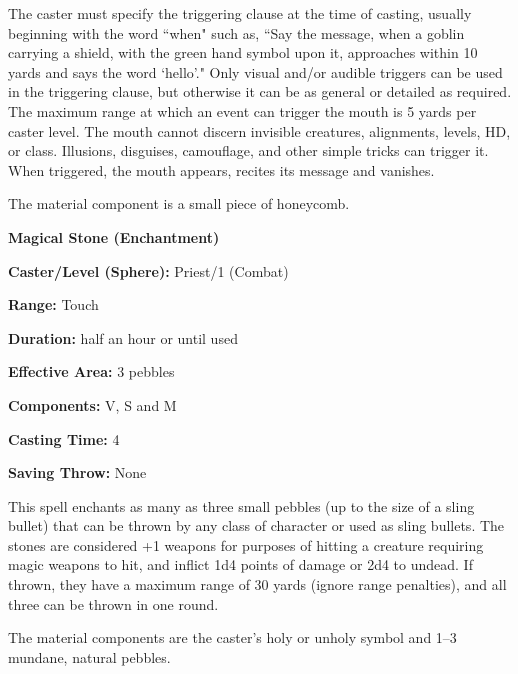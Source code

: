 \begin{multicols}{2}
The caster must specify the triggering clause at the time of casting, usually beginning with the word ``when" such as, ``Say the message, when a goblin carrying a shield, with the green hand symbol upon it, approaches within 10 yards and says the word `hello'."  Only visual and/or audible triggers can be used in the triggering clause, but otherwise it can be as general or detailed as required.  The maximum range at which an event can trigger the mouth is 5 yards per caster level.  The mouth cannot discern invisible creatures, alignments, levels, HD, or class.  Illusions, disguises, camouflage, and other simple tricks can trigger it.  When triggered, the mouth appears, recites its message and vanishes.

The material component is a small piece of honeycomb.

\vspace{1em}

\noindent
\begin{minipage}{\columnwidth}

\noindent \textbf{Magical Stone (Enchantment)}

\noindent \textbf{Caster/Level (Sphere):} Priest/1 (Combat)

\noindent \textbf{Range:} Touch

\noindent \textbf{Duration:} half an hour or until used

\noindent \textbf{Effective Area:} 3 pebbles

\noindent \textbf{Components:} V, S and M

\noindent \textbf{Casting Time:} 4

\noindent \textbf{Saving Throw:} None

\end{minipage}

This spell enchants as many as three small pebbles (up to the size of a sling bullet) that can be thrown by any class of character or used as sling bullets.  The stones are considered +1 weapons for purposes of hitting a creature requiring magic weapons to hit, and inflict 1d4 points of damage or 2d4 to undead.  If thrown, they have a maximum range of 30 yards (ignore range penalties), and all three can be thrown in one round.

The material components are the caster's holy or unholy symbol and 1--3 mundane, natural pebbles.

\vspace{1em}

\noindent
\begin{minipage}{\columnwidth}


\end{minipage}
\end{multicols}
